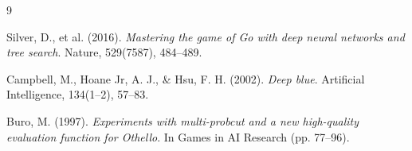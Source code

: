 \begin{thebibliography}{9}

Silver, D., et al. (2016).
\textit{Mastering the game of Go with deep neural networks and tree search}.
Nature, 529(7587), 484--489.

Campbell, M., Hoane Jr, A. J., \& Hsu, F. H. (2002).
\textit{Deep blue}.
Artificial Intelligence, 134(1--2), 57--83.

Buro, M. (1997).
\textit{Experiments with multi-probcut and a new high-quality evaluation function for Othello}.
In Games in AI Research (pp. 77--96).

\end{thebibliography}
